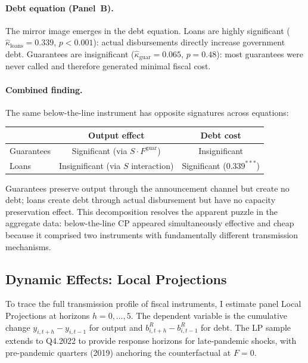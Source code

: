 \paragraph{Debt equation (Panel~B).} The mirror image emerges in the debt equation. Loans are highly significant ($\hat{\kappa}_{\text{loans}} = 0.339$, $p < 0.001$): actual disbursements directly increase government debt. Guarantees are insignificant ($\hat{\kappa}_{\text{guar}} = 0.065$, $p = 0.48$): most guarantees were never called and therefore generated minimal fiscal cost.

\paragraph{Combined finding.} The same below-the-line instrument has opposite signatures across equations:
%
\begin{center}
\begin{tabular}{lcc}
\toprule
 & Output effect & Debt cost \\
\midrule
Guarantees & Significant (via $S \cdot F^{\text{guar}}$) & Insignificant \\
Loans & Insignificant (via $S$ interaction) & Significant ($0.339^{***}$) \\
\bottomrule
\end{tabular}
\end{center}
%
Guarantees preserve output through the announcement channel but create no debt; loans create debt through actual disbursement but have no capacity preservation effect. This decomposition resolves the apparent puzzle in the aggregate data: below-the-line CP appeared simultaneously effective and cheap because it comprised two instruments with fundamentally different transmission mechanisms.

%

\subsection{Dynamic Effects: Local Projections}
\label{subsec:lp_results}

To trace the full transmission profile of fiscal instruments, I estimate panel Local Projections \citep{jorda2005} at horizons $h = 0, \ldots, 5$. The dependent variable is the cumulative change $y_{i,t+h} - y_{i,t-1}$ for output and $b_{i,t+h}^R - b_{i,t-1}^R$ for debt. The LP sample extends to Q4.2022 to provide response horizons for late-pandemic shocks, with pre-pandemic quarters (2019) anchoring the counterfactual at $F = 0$.

